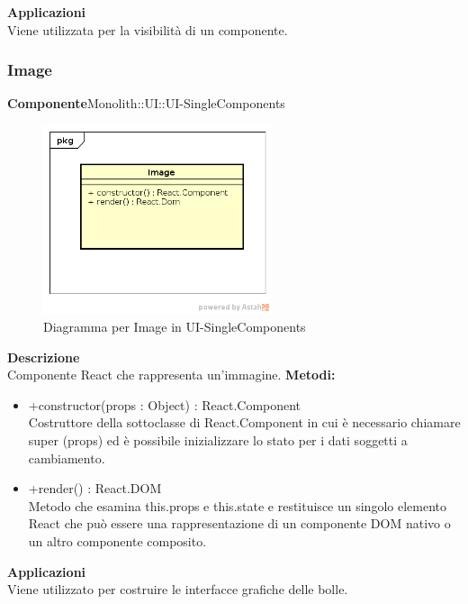 \textbf{Applicazioni}\\
Viene utilizzata per la visibilità di un componente. 


\clearpage

\subsubsection{Image}
\textbf{Componente}Monolith::UI::UI-SingleComponents\\
   \FloatBarrier
   \begin{figure}[ht]
   \centering
   \includegraphics[width=0.6\textwidth]{img/single-Image}
   \caption{{Diagramma per Image in UI-SingleComponents}}
\end{figure}
\FloatBarrier
\textbf{Descrizione}\\
Componente React che rappresenta un'immagine.
\textbf{Metodi:} \begin{itemize}\item +constructor(props : Object) : React.Component \\Costruttore della sottoclasse di React.Component in cui è necessario chiamare super (props) ed è possibile inizializzare lo stato per i dati soggetti a cambiamento.\item +render() : React.DOM \\Metodo che esamina this.props e this.state e restituisce un singolo elemento React che può essere una rappresentazione di un componente DOM nativo o un altro componente composito.\end{itemize} 


\textbf{Applicazioni}\\
Viene utilizzato per costruire le interfacce grafiche delle bolle. 


\clearpage

